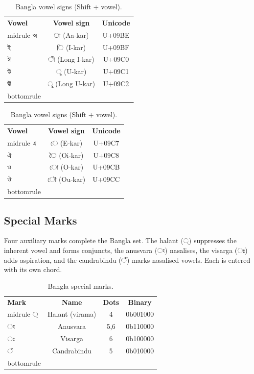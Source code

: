 \documentclass[11pt,a4paper,twoside]{article}
\newcommand{\bengali}[1]{#1}
\begin{document}
\begin{table}[H]\centering
\caption{Bangla vowel signs (Shift + vowel).}\label{tab:bangla-vowelsigns}
\begin{minipage}{0.46\textwidth}
\begin{tabular}{l c c}\toprule
\textbf{Vowel} & \textbf{Vowel sign} & \textbf{Unicode} \\midrule
অ & া (Aa-kar)  & U+09BE \\
ই & ি (I-kar)   & U+09BF \\
ঈ & ী (Long I-kar) & U+09C0 \\
উ & ু (U-kar)   & U+09C1 \\
ঊ & ূ (Long U-kar) & U+09C2 \\bottomrule
\end{tabular}
\end{minipage}\hfill
\begin{minipage}{0.46\textwidth}
\begin{tabular}{l c c}\toprule
\textbf{Vowel} & \textbf{Vowel sign} & \textbf{Unicode} \\midrule
এ & ে (E-kar)   & U+09C7 \\
ঐ & ৈ (Oi-kar)  & U+09C8 \\
ও & ো (O-kar)   & U+09CB \\
ঔ & ৌ (Ou-kar)  & U+09CC \\bottomrule
\end{tabular}
\end{minipage}
\end{table}

\subsection{Special Marks}
Four auxiliary marks complete the Bangla set. The halant (\bengali{্})
suppresses the inherent vowel and forms conjuncts, the anusvara
(\bengali{ং}) nasalises, the visarga (\bengali{ঃ}) adds aspiration, and
the candrabindu (\bengali{ঁ}) marks nasalised vowels. Each is entered
with its own chord.

\begin{table}[H]\centering
\caption{Bangla special marks.}\label{tab:bangla-marks}
\begin{tabular}{l c c c}\toprule
\textbf{Mark} & \textbf{Name} & \textbf{Dots} & \textbf{Binary} \\midrule
্ & Halant (virama)   & 4     & 0b001000 \\
ং & Anusvara          & 5,6   & 0b110000 \\
ঃ & Visarga           & 6     & 0b100000 \\
ঁ & Candrabindu       & 5     & 0b010000 \\bottomrule
\end{tabular}\end{table}
\end{document}
